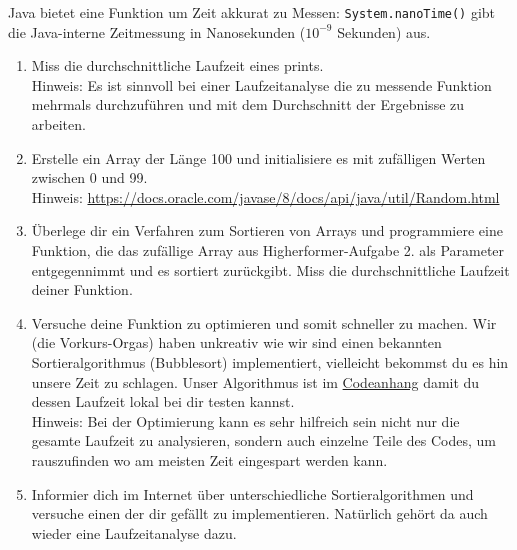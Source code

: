 \documentclass{../../sheet}
\begin{document}
\newpage
{}
Java bietet eine Funktion um Zeit akkurat zu Messen: \texttt{System.nanoTime()} gibt die Java-interne Zeitmessung in Nanosekunden ($10^{-9}$ Sekunden) aus.
\begin{enumerate}
    \item Miss die durchschnittliche Laufzeit eines prints.\\
          Hinweis: Es ist sinnvoll bei einer Laufzeitanalyse die zu messende Funktion mehrmals durchzuführen und mit dem Durchschnitt der Ergebnisse zu arbeiten.
    \item Erstelle ein Array der Länge 100 und initialisiere es mit zufälligen Werten zwischen 0 und 99.\\
          Hinweis: \url{https://docs.oracle.com/javase/8/docs/api/java/util/Random.html}
    \item Überlege dir ein Verfahren zum Sortieren von Arrays und programmiere eine Funktion, die das zufällige Array aus Higherformer-Aufgabe 2. als Parameter entgegennimmt und es sortiert zurückgibt. Miss die durchschnittliche Laufzeit deiner Funktion.
    \item Versuche deine Funktion zu optimieren und somit schneller zu machen. Wir (die Vorkurs-Orgas) haben unkreativ wie wir sind einen bekannten Sortieralgorithmus (Bubblesort) implementiert, vielleicht bekommst du es hin unsere Zeit zu schlagen. Unser Algorithmus ist im \hyperlink{Highperformer}{Codeanhang} damit du dessen Laufzeit lokal bei dir testen kannst.\\
          Hinweis: Bei der Optimierung kann es sehr hilfreich sein nicht nur die gesamte Laufzeit zu analysieren, sondern auch einzelne Teile des Codes, um rauszufinden wo am meisten Zeit eingespart werden kann.
    \item Informier dich im Internet über unterschiedliche Sortieralgorithmen und versuche einen der dir gefällt zu implementieren. Natürlich gehört da auch wieder eine Laufzeitanalyse dazu.
\end{enumerate}
\end{document}
